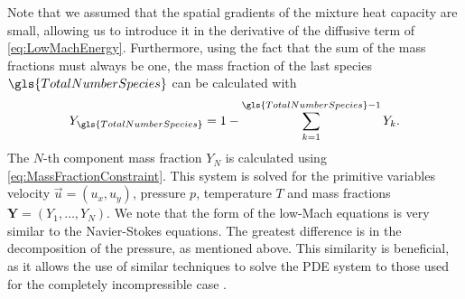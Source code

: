 Note that we assumed that the spatial gradients of the mixture heat capacity are small, allowing us to introduce it in the derivative of the diffusive term of \cref{eq:LowMachEnergy}. Furthermore, using the fact that the sum of the mass fractions must always be one, the mass fraction of the last species $\gls{TotalNumberSpecies}$ can be calculated with
\begin{align} \label{eq:MassFractionConstraint}
Y_{\gls{TotalNumberSpecies}} = 1 - \sum_{k = 1}^{\gls{TotalNumberSpecies}-1}Y_k.
\end{align}
The $N$-th component mass fraction $Y_{N}$ is calculated using \cref{eq:MassFractionConstraint}. This system is solved for the primitive variables velocity $\vec{u} = (u_x, u_y)$, pressure $p$, temperature $T$ and mass fractions ${\mathbf{Y} = (Y_1,\dots,Y_{N})}$. We note that the form of the low-Mach equations is very similar to the Navier-Stokes equations. The greatest difference is in the decomposition of the pressure, as mentioned above. This similarity is beneficial, as it allows the use of similar techniques to solve the PDE system to those used for the completely incompressible case \citep{keshtibanCompressibleFlowSolvers2003}.

